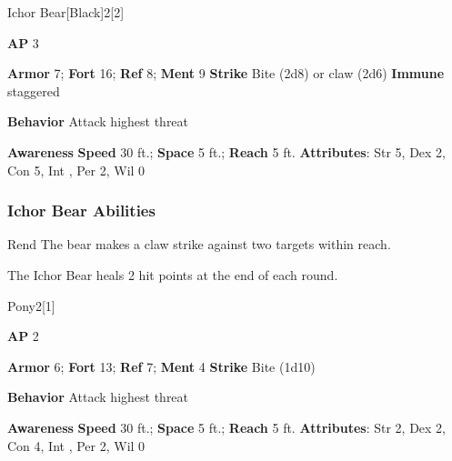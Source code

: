 \begin{monsection}{Ichor Bear}[Black]{2}[2]
\vspace{-1em}\vspace{-1em}
\begin{spellcontent}
\begin{spelltargetinginfo}
{\textbf{AP} 3}

\pari \textbf{Armor} 7;
\textbf{Fort} 16;
\textbf{Ref} 8;
\textbf{Ment} 9
\pari \textbf{Strike} Bite  (2d8) or claw  (2d6)
\pari \textbf{Immune} staggered


\pari \textbf{Behavior} Attack highest threat
\end{spelltargetinginfo}
\end{spellcontent}

\begin{monsterfooter}
\pari \textbf{Awareness} 
\pari \textbf{Speed} 30 ft.;
\textbf{Space} 5 ft.;
\textbf{Reach} 5 ft.
\pari \textbf{Attributes}:
Str 5,
Dex 2,
Con 5,
Int ,
Per 2,
Wil 0
\end{monsterfooter}
\end{monsection}


\subsubsection{Ichor Bear Abilities}

\begin{freeability}{Rend}
The bear makes a claw strike against two targets within reach.
\end{freeability}

The Ichor Bear heals 2 hit points at the end of each round.

\begin{monsection}{Pony}{2}[1]
\vspace{-1em}\vspace{-1em}
\begin{spellcontent}
\begin{spelltargetinginfo}
{\textbf{AP} 2}

\pari \textbf{Armor} 6;
\textbf{Fort} 13;
\textbf{Ref} 7;
\textbf{Ment} 4
\pari \textbf{Strike} Bite  (1d10)



\pari \textbf{Behavior} Attack highest threat
\end{spelltargetinginfo}
\end{spellcontent}

\begin{monsterfooter}
\pari \textbf{Awareness} 
\pari \textbf{Speed} 30 ft.;
\textbf{Space} 5 ft.;
\textbf{Reach} 5 ft.
\pari \textbf{Attributes}:
Str 2,
Dex 2,
Con 4,
Int ,
Per 2,
Wil 0
\end{monsterfooter}
\end{monsection}

